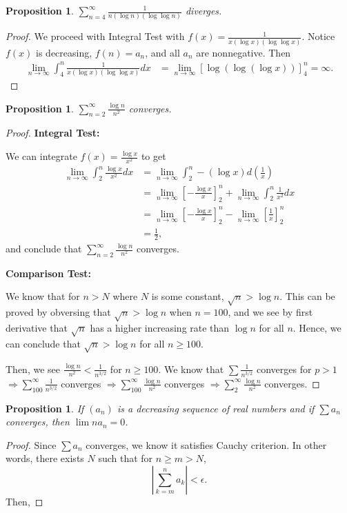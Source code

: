 \documentclass{article}
\newtheorem{proposition}[thm]{Proposition}
\begin{document}
\begin{proposition}
    $\sum_{n=4}^{\infty}\frac{1}{n(\log n)(\log\log n)}$ diverges.
\end{proposition}
\begin{proof}
    We proceed with Integral Test with $f(x)=\frac{1}{x(\log x)(\log\log x)}$. Notice $f(x)$ is 
    decreasing, $f(n) = a_n$, and all $a_n$ are nonnegative. Then
    \begin{align*}
        \lim_{n\to\infty}\int_{4}^{n}\frac{1}{x(\log x)(\log\log x)}dx & = 
        \lim_{n\to\infty}\left[\log(\log(\log x))\right]_4^n = \infty.
    \end{align*}
\end{proof}

\newpage
\begin{proposition}
    $\sum_{n=2}^{\infty}\frac{\log n}{n^2}$ converges.
\end{proposition}
\begin{proof}
    \textbf{Integral Test:} 

    We can integrate $f(x)=\frac{\log x}{x^2}$ to get
    \begin{align*}
        \lim_{n\to\infty}\int_{2}^{n}\frac{\log x}{x^2}dx & = 
        \lim_{n\to\infty}\int_{2}^{n}-(\log x)d\left(\frac{1}{x}\right) \\
        & = \lim_{n\to\infty}\left[-\frac{\log x}{x}\right]_2^n +
        \lim_{n\to\infty}\int_{2}^{n}\frac{1}{x^2}dx \\
        & = \lim_{n\to\infty}\left[-\frac{\log x}{x}\right]_2^n -
        \lim_{n\to\infty}\left[\frac{1}{x}\right]_2^n \\
        & = \frac{1}{2},
    \end{align*}
    and conclude that $\sum_{n=2}^{\infty}\frac{\log n}{n^2}$ converges.

    \textbf{Comparison Test:}

    We know that for $n>N$ where $N$ is some constant, $\sqrt{n} > \log n$. This can be proved by 
    obversing that $\sqrt{n} > \log n$ when $n = 100$, and we see by first derivative that 
    $\sqrt{n}$ has a higher increasing rate than $\log n$ for all $n$. Hence, we can conclude that 
    $\sqrt{n} > \log n$ for all $n\ge 100$.

    Then, we see $\frac{\log n}{n^2} < \frac{1}{n^{3/2}}$ for $n\ge 100$. We know that 
    $\sum \frac{1}{n^{3/2}}$ converges for $p>1$ $\Rightarrow \sum_{100}^{\infty}\frac{1}{n^{3/2}}$
    converges $\Rightarrow \sum_{100}^{\infty}\frac{\log n}{n^2}$ converges $\Rightarrow 
    \sum_{2}^{\infty}\frac{\log n}{n^2}$ converges.
\end{proof}

\begin{proposition}
    If $(a_n)$ is a decreasing sequence of real numbers and if $\sum a_n$ converges, then 
    $\lim na_n=0$.
\end{proposition}
\begin{proof}
    Since $\sum a_n$ converges, we know it satisfies Cauchy criterion. In other words, there exists 
    $N$ such that for $n\ge m>N$, $$\left|\sum_{k=m}^{n}a_k\right| < \epsilon.$$ Then, 
\end{proof}
\end{document}
